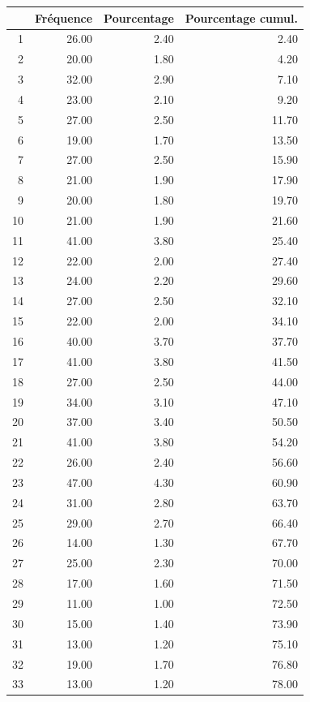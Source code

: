 \documentclass[12pt,english,french,twoside]{report}\usepackage[]{graphicx}\usepackage[]{color}
\begin{document}
\begin{table}[ht]
\centering
\begin{tabular}{rrrr}
  \hline
 & Fréquence & Pourcentage & Pourcentage cumul. \\ 
  \hline
1 & 26.00 & 2.40 & 2.40 \\ 
  2 & 20.00 & 1.80 & 4.20 \\ 
  3 & 32.00 & 2.90 & 7.10 \\ 
  4 & 23.00 & 2.10 & 9.20 \\ 
  5 & 27.00 & 2.50 & 11.70 \\ 
  6 & 19.00 & 1.70 & 13.50 \\ 
  7 & 27.00 & 2.50 & 15.90 \\ 
  8 & 21.00 & 1.90 & 17.90 \\ 
  9 & 20.00 & 1.80 & 19.70 \\ 
  10 & 21.00 & 1.90 & 21.60 \\ 
  11 & 41.00 & 3.80 & 25.40 \\ 
  12 & 22.00 & 2.00 & 27.40 \\ 
  13 & 24.00 & 2.20 & 29.60 \\ 
  14 & 27.00 & 2.50 & 32.10 \\ 
  15 & 22.00 & 2.00 & 34.10 \\ 
  16 & 40.00 & 3.70 & 37.70 \\ 
  17 & 41.00 & 3.80 & 41.50 \\ 
  18 & 27.00 & 2.50 & 44.00 \\ 
  19 & 34.00 & 3.10 & 47.10 \\ 
  20 & 37.00 & 3.40 & 50.50 \\ 
  21 & 41.00 & 3.80 & 54.20 \\ 
  22 & 26.00 & 2.40 & 56.60 \\ 
  23 & 47.00 & 4.30 & 60.90 \\ 
  24 & 31.00 & 2.80 & 63.70 \\ 
  25 & 29.00 & 2.70 & 66.40 \\ 
  26 & 14.00 & 1.30 & 67.70 \\ 
  27 & 25.00 & 2.30 & 70.00 \\ 
  28 & 17.00 & 1.60 & 71.50 \\ 
  29 & 11.00 & 1.00 & 72.50 \\ 
  30 & 15.00 & 1.40 & 73.90 \\ 
  31 & 13.00 & 1.20 & 75.10 \\ 
  32 & 19.00 & 1.70 & 76.80 \\ 
  33 & 13.00 & 1.20 & 78.00 \\ 

\end{tabular}
\end{table}
\end{document}
